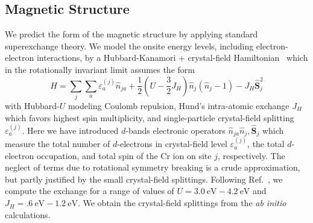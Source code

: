 \documentclass[aps,prl,showpacs,twocolumn,superscriptaddress,floatfix]{revtex4-2}
\begin{document}
\subsection{Magnetic Structure}

We predict the form of the magnetic structure by applying standard superexchange theory.
We model the onsite energy levels, including electron-electron interactions, by a Hubbard-Kanamori + crystal-field Hamiltonian~\cite{Georges.2013} which in the rotationally invariant limit assumes the form 
\begin{equation}
\label{eqn:SEJ}
    H = \sum_j  \sum_a \varepsilon_a^{(j)} \hat{n}_{ja} + \frac12 (U-\frac32 J_H )\hat{n}_j (\hat{n}_j -1) - J_H \hat{\mathbf{S}}_j^2 
\end{equation}
with Hubbard-$U$ modeling Coulomb repulsion, Hund's intra-atomic exchange $J_H$ which favors highest spin multiplicity, and single-particle crystal-field splitting $\varepsilon_a^{(j)}$.
Here we have introduced $d$-bands electronic operators $\hat{n}_{ja}\hat{n}_j,\hat{\mathbf{S}}_j$ which measure the total number of $d$-electrons in crystal-field level $\varepsilon_a^{(j)}$, the total $d$-electron occupation, and total spin of the Cr ion on site $j$, respectively.
The neglect of terms due to rotational symmetry breaking is a crude approximation, but partly justified by the small crystal-field splittings.
Following Ref.~, we compute the exchange for a range of values of $U = \SI{3.0}{\eV}-\SI{4.2}{\eV}$ and $J_H = \SI{.6}{\eV} - \SI{1.2}{\eV}$.
We obtain the crystal-field splittings from the {\it ab initio} calculations.
\end{document}

